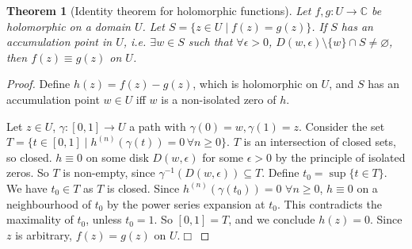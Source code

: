\documentclass{article}
\theoremstyle{plain}\theoremheaderfont{\normalfont\itshape}\theorembodyfont{\rmfamily}\theoremseparator{.}\newtheorem*{rem}{Remark}\newtheorem*{ex}{Example}\newtheorem*{proof}{Proof}\newtheorem*{altp}{Alternative proof}\newtheorem*{con}{Consequences}\newtheorem*{notn}{Notations}\newtheorem*{cau}{Caution}\newtheorem*{term}{Terminology}\newtheorem*{keyex}{Key example}
\theoremstyle{plain}\theoremheaderfont{\normalfont\bfseries}\theorembodyfont{\rmfamily}\theoremseparator{.}\newtheorem{thm}{Theorem}[section]\newtheorem{lem}[thm]{Lemma}\newtheorem{prop}[thm]{Proposition}\newtheorem*{cor}{Corollary}\newtheorem{defn}[thm]{Definition}\newtheorem{clm}[thm]{Claim}\newtheorem{clminproof}{Claim}\newtheorem{leminproof}{Lemma}\newtheorem{app}{Application}
\theoremstyle{break}\theoremheaderfont{\normalfont\itshape}\theorembodyfont{\rmfamily}\theoremseparator{.\medskip}\newtheorem*{proofskip}{Proof}\newtheorem*{exs}{Examples}\newtheorem*{rems}{Remarks}\newtheorem*{rec}{Recall}\newtheorem*{ppts}{Properties}
\theoremstyle{break}\theoremheaderfont{\normalfont\bfseries}\theorembodyfont{\rmfamily}\theoremseparator{.\medskip}\newtheorem{lemskip}[thm]{Lemma}\newtheorem{defnskip}[thm]{Definition}\newtheorem{propskip}[thm]{Proposition}\newtheorem{thmskip}[thm]{Theorem}
\numberwithin{equation}{section}
\newcommand{\qed}{\hfill\ensuremath{\Box}}
\newcommand{\CC}{\mathbb{C}}
\begin{document}
    \begin{thm}[Identity theorem for holomorphic functions]
        Let \(f,g:U\to\CC\) be holomorphic on a domain \(U\). Let \(S=\{z\in U\mid f(z)=g(z)\}\). If \(S\) has an accumulation point in \(U\), i.e. \(\exists w\in S\) such that \(\forall\epsilon>0\), \(D(w,\epsilon)\setminus\{w\}\cap S\ne\varnothing\), then \(f(z)\equiv g(z)\) on \(U\).
    \end{thm}
    \begin{proof}
        Define \(h(z)=f(z)-g(z)\), which is holomorphic on \(U\), and \(S\) has an accumulation point \(w\in U\) iff \(w\) is a non-isolated zero of \(h\).

        Let \(z\in U\), \(\gamma:[0,1]\to U\) a path with \(\gamma(0)=w,\gamma(1)=z\). Consider the set \(T=\{t\in[0,1]\mid h^{(n)}(\gamma(t))=0\,\forall n\ge 0\}\). \(T\) is an intersection of closed sets, so closed. \(h\equiv 0\) on some disk \(D(w,\epsilon)\) for some \(\epsilon>0\) by the principle of isolated zeros. So \(T\) is non-empty, since \(\gamma^{-1}(D(w,\epsilon))\subseteq T\). Define \(t_0=\sup\{t\in T\}\). We have \(t_0\in T\) as \(T\) is closed. Since \(h^{(n)}(\gamma(t_0))=0\) \(\forall n\ge 0\), \(h\equiv 0\) on a neighbourhood of \(t_0\) by the power series expansion at \(t_0\). This contradicts the maximality of \(t_0\), unless \(t_0=1\). So \([0,1]=T\), and we conclude \(h(z)=0\). Since \(z\) is arbitrary, \(f(z)=g(z)\) on \(U\).\qed 
    \end{proof}
\end{document}
